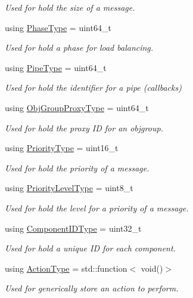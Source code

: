 \begin{DoxyCompactItemize}
\begin{DoxyCompactList}\small\item\em Used for hold the size of a message. \end{DoxyCompactList}\item 
using \hyperlink{namespacevt_a46ce6733d5cdbd735d561b7b4029f6d7}{Phase\+Type} = uint64\+\_\+t
\begin{DoxyCompactList}\small\item\em Used for hold a phase for load balancing. \end{DoxyCompactList}\item 
using \hyperlink{namespacevt_ac9852acda74d1896f48f406cd72c7bd3}{Pipe\+Type} = uint64\+\_\+t
\begin{DoxyCompactList}\small\item\em Used for hold the identifier for a pipe (callbacks) \end{DoxyCompactList}\item 
using \hyperlink{namespacevt_ad7cae989df485fccca57f0792a880a8e}{Obj\+Group\+Proxy\+Type} = uint64\+\_\+t
\begin{DoxyCompactList}\small\item\em Used for hold the proxy ID for an objgroup. \end{DoxyCompactList}\item 
using \hyperlink{namespacevt_a86bff9f556eb761b27fc8600d006ac04}{Priority\+Type} = uint16\+\_\+t
\begin{DoxyCompactList}\small\item\em Used for hold the priority of a message. \end{DoxyCompactList}\item 
using \hyperlink{namespacevt_a53e07fdb3351b0f263e0dfd51b968d5e}{Priority\+Level\+Type} = uint8\+\_\+t
\begin{DoxyCompactList}\small\item\em Used for hold the level for a priority of a message. \end{DoxyCompactList}\item 
using \hyperlink{namespacevt_ab6ac935c168b809c422d5121da4f2700}{Component\+I\+D\+Type} = uint32\+\_\+t
\begin{DoxyCompactList}\small\item\em Used for hold a unique ID for each component. \end{DoxyCompactList}\item 
using \hyperlink{namespacevt_ae0a5a7b18cc99d7b732cb4d44f46b0f3}{Action\+Type} = std\+::function$<$ void()$>$
\begin{DoxyCompactList}\small\item\em Used for generically store an action to perform. \end{DoxyCompactList}\item 

\end{DoxyCompactItemize}

